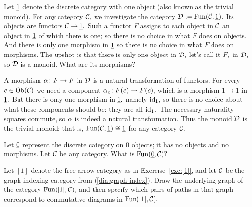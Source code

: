 \documentclass[../main/CT4S-EN-RU]{subfiles}
\begin{document}
\begin{exampleENG}
Let $\underline{1}$ denote the discrete category with one object (also known as the trivial monoid). For any category $\mathcal{C},$ we investigate the category $\mathcal{D}:=\operatorname{Fun}(\mathcal{C},\underline{1}).$ Its objects are functors $\mathcal{C}\rightarrow\underline{1}.$ Such a functor $F$ assigns to each object in $\mathcal{C}$ an object in $\underline{1}$ of which there is one; so there is no choice in what $F$ does on objects. And there is only one morphism in $\underline{1}$ so there is no choice in what $F$ does on morphisms. The upshot is that there is only one object in $\mathcal{D},$ let's call it $F,$ in $\mathcal{D},$ so $\mathcal{D}$ is a monoid. What are its morphisms? 

A morphism $\alpha\colon F\rightarrow F$ in $\mathcal{D}$ is a natural transformation of functors. For every $c\in\operatorname{Ob}(\mathcal{C})$ we need a component $\alpha_c\colon F(c)\rightarrow F(c),$ which is a morphism $1\to 1$ in $\underline{1}.$ But there is only one morphism in $\underline{1},$ namely $\operatorname{id}_1,$ so there is no choice about what these components should be: they are all $\operatorname{id}_1.$ The necessary naturality squares commute, so $\alpha$ is indeed a natural transformation. Thus the monoid $\mathcal{D}$ is the trivial monoid; that is, $\operatorname{Fun}(\mathcal{C},\underline{1})\cong\underline{1}$ for any category $\mathcal{C}.$
\end{exampleENG}

\begin{exampleRUS}
\end{exampleRUS}

\begin{exerciseENG}
Let $\underline{0}$ represent the discrete category on 0 objects; it has no objects and no morphisms. Let $\mathcal{C}$ be any category. What is $\operatorname{Fun}(\underline{0},\mathcal{C})?$
\end{exerciseENG}

\begin{exerciseRUS}
\end{exerciseRUS}

\begin{exerciseENG}
Let $[1]$ denote the free arrow category as in Exercise~\ref{exc:[1]}, and let $\mathcal{C}$ be the graph indexing category from (\ref{dia:graph index}). Draw the underlying graph of the category $\operatorname{Fun}([1],\mathcal{C}),$ and then specify which pairs of paths in that graph correspond to commutative diagrams in $\operatorname{Fun}([1],\mathcal{C}).$
\end{exerciseENG}

\begin{exerciseRUS}
\end{exerciseRUS}

\end{document}
